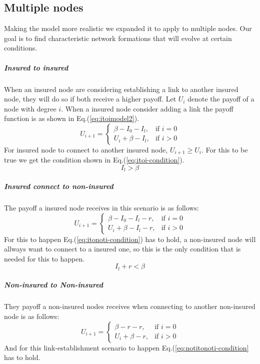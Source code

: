 \subsection{Multiple nodes}
Making the model more realistic we expanded it to apply to multiple nodes. Our goal is to find characteristic network formations that will evolve at certain conditions. 
\subparagraph{Insured to insured}
When an insured node are considering establishing a link to another insured node, they will do so if both receive a higher payoff. Let $U_{i}$ denote the payoff of a node with degree $i$. When a insured node consider adding a link the payoff function is as shown in Eq.(\ref{eq:itoimodel2}).
\begin{equation}
    U_{i+1}= 
\begin{cases}
    \beta - I_{0} - I_{l},& \text{if } i = 0\\
    U_{i}+\beta -I_{l},& \text{if }  i>0
   
\end{cases}
\label{eq:itoimodel2}
\end{equation}
For insured node to connect to another insured node, $U_{i+1}\geq U_{i}$. For this to be true we get the condition shown in Eq.(\ref{eq:itoi-condition}).
\begin{equation}
I_{l}>\beta
\label{eq:itoi-condition}
\end{equation}
\subparagraph{Insured connect to non-insured}
The payoff a insured node receives in this scenario is as follows:
\begin{equation}
    U_{i+1}= 
\begin{cases}
    \beta - I_{0} - I_{l}-r,& \text{if } i = 0\\
    U_{i}+\beta -I_{l}-r,& \text{if }  i>0
   
\end{cases}
\label{eq:itonotimodel2}
\end{equation}
For this to happen Eq.(\ref{eq:itonoti-condition}) has to hold, a non-insured node will allways want to connect to a insured one, so this is the only condition that is needed for this to happen.
\begin{equation}
I_{l}+r<\beta
\label{eq:itonoti-condition}
\end{equation}
\subparagraph{Non-insured to Non-insured}
They payoff a non-insured nodes receives when connecting to another non-insured node is as follows:
\begin{equation}
    U_{i+1}= 
\begin{cases}
    \beta -r -r,& \text{if } i = 0\\
    U_{i}+\beta -r,& \text{if }  i>0
   
\end{cases}
\label{eq:notitonotimodel2}
\end{equation}
And for this link-establishment scenario to happen Eq.(\ref{eq:notitonoti-condition} has to hold.

